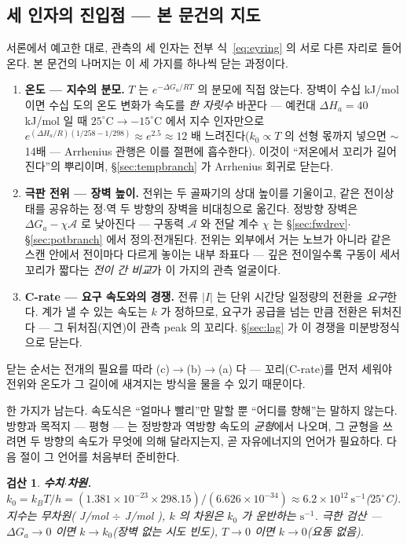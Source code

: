 \documentclass[11pt,a4paper]{article}
\newtheorem*{verifybox}{검산}
\begin{document}
\subsection{세 인자의 진입점 — 본 문건의 지도}
서론에서 예고한 대로, 관측의 세 인자는 전부 식~\eqref{eq:eyring} 의 서로 다른 자리로 들어온다. 본 문건의
나머지는 이 세 가지를 하나씩 닫는 과정이다.
\begin{enumerate}[label=\textbf{(\alph*)},leftmargin=2.2em,itemsep=2pt]
\item \textbf{온도 — 지수의 분모.} $T$ 는 $e^{-\Delta G_a/RT}$ 의 분모에 직접 앉는다. 장벽이 수십
  kJ/mol 이면 수십 도의 온도 변화가 속도를 \emph{한 자릿수} 바꾼다 — 예컨대 $\Delta H_a=40$ kJ/mol 일 때
  $25^\circ\mathrm C\to-15^\circ\mathrm C$ 에서 지수 인자만으로
  $e^{(\Delta H_a/R)(1/258-1/298)}\approx e^{2.5}\approx12$ 배 느려진다($k_0\propto T$ 의 선형 몫까지
  넣으면 $\sim$14배 — Arrhenius 관행은 이를 절편에 흡수한다). 이것이 ``저온에서 꼬리가 길어진다''의 뿌리이며, \S\ref{sec:tempbranch} 가 Arrhenius 회귀로
  닫는다.
\item \textbf{극판 전위 — 장벽 높이.} 전위는 두 골짜기의 상대 높이를 기울이고, 같은 전이상태를 공유하는
  정$\cdot$역 두 방향의 장벽을 비대칭으로 옮긴다. 정방향 장벽은 $\Delta G_a-\chi\mathcal A$ 로 낮아진다
  — 구동력 $\mathcal A$ 와 전달 계수 $\chi$ 는 \S\ref{sec:fwdrev}$\cdot$\S\ref{sec:potbranch} 에서
  정의$\cdot$전개된다. 전위는 외부에서 거는 노브가 아니라 같은 스캔 안에서 전이마다 다르게 놓이는 내부
  좌표다 — 깊은 전이일수록 구동이 세서 꼬리가 짧다는 \emph{전이 간 비교}가 이 가지의 관측 얼굴이다.
\item \textbf{C-rate — 요구 속도와의 경쟁.} 전류 $|I|$ 는 단위 시간당 일정량의 전환을 \emph{요구}한다.
  계가 낼 수 있는 속도는 $k$ 가 정하므로, 요구가 공급을 넘는 만큼 전환은 뒤처진다 — 그 뒤처짐(지연)이
  관측 peak 의 꼬리다. \S\ref{sec:lag} 가 이 경쟁을 미분방정식으로 닫는다.
\end{enumerate}
닫는 순서는 전개의 필요를 따라 (c)$\to$(b)$\to$(a) 다 — 꼬리(C-rate)를 먼저 세워야 전위와 온도가 그
길이에 새겨지는 방식을 물을 수 있기 때문이다.

한 가지가 남는다. 속도식은 ``얼마나 빨리''만 말할 뿐 ``어디를 향해''는 말하지 않는다. 방향과 목적지 —
평형 — 는 정방향과 역방향 속도의 \emph{균형}에서 나오며, 그 균형을 쓰려면 두 방향의 속도가 무엇에 의해
달라지는지, 곧 자유에너지의 언어가 필요하다. 다음 절이 그 언어를 처음부터 준비한다.

\begin{verifybox}
\textbf{수치$\cdot$차원.} $k_0=k_BT/h=(1.381\times10^{-23}\times298.15)/(6.626\times10^{-34})
\approx6.2\times10^{12}\ \mathrm{s^{-1}}$($25^\circ$C). 지수는 무차원( J/mol $\div$ J/mol ), $k$ 의
차원은 $k_0$ 가 운반하는 $\mathrm{s^{-1}}$. 극한 검산 — $\Delta G_a\to0$ 이면 $k\to k_0$(장벽 없는
시도 빈도), $T\to0$ 이면 $k\to0$(요동 없음).
\end{verifybox}
\end{document}
